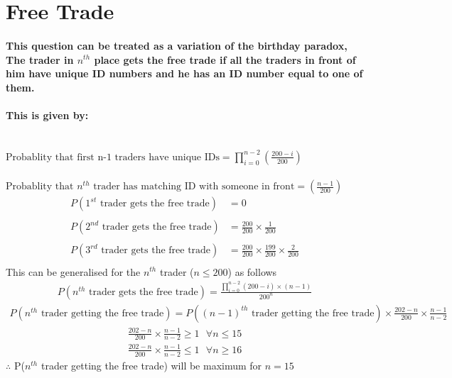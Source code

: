 \section{Free Trade}
\paragraph{This question can be treated as a variation of the birthday paradox, The trader in \( n^{th} \) place gets the free trade if all the traders in front of him have unique ID numbers and he has an ID number equal to one of them. \\\\This is given by: \\\\}
$\text{Probablity that first n-1 traders have unique IDs} = \prod_{i=0}^{n-2} (\frac{200-i}{200})$\\\\
$\text{Probablity that $n^{th}$ trader has matching ID with someone in front} = (\frac{n-1}{200})$
\begin{align*}
	P(\text{\(1^{st}\) trader gets the free trade}) & = 0                                                           \\\\
	P(\text{\(2^{nd}\) trader gets the free trade}) & = \frac{200}{200} \times \frac{1}{200}                        \\\\
	P(\text{\(3^{rd}\) trader gets the free trade}) & = \frac{200}{200} \times \frac{199}{200} \times \frac{2}{200} \\
\end{align*}
This can be generalised for the \(n^{th}\) trader (\(n \leq 200\)) as follows
\begin{align*}
	P(\text{\(n^{th}\) trader gets the free trade}) = \frac{\prod_{i=0}^{n-2} (200-i) \times (n-1)}{200^n}
\end{align*}
\begin{align*}
	P(n^{th} \text{ trader getting the free trade}) = P((n-1)^{th} \text{ trader getting the free trade}) \times \frac{202-n}{200} \times \frac{n-1}{n-2}
\end{align*}
\begin{align*}
	\frac{202-n}{200} \times \frac{n-1}{n-2} \geq 1 \text{ } \forall n \leq 15 \\
	\frac{202-n}{200} \times \frac{n-1}{n-2} \leq 1 \text{ } \forall n \geq 16
\end{align*}
$\therefore$ P($n^{th}$ trader getting the free trade) will be maximum for $n = 15$\\
